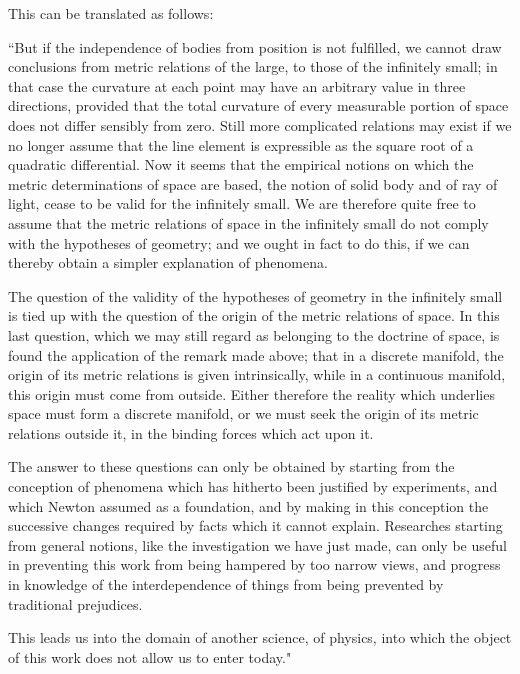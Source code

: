 \documentclass[12pt]{article}
\begin{document}
This can be translated as follows:

``But if the
independence of bodies from position is not fulfilled, we cannot
draw conclusions from metric relations of the large, to those of
the infinitely small; in that case the curvature at each point
may have an arbitrary value in three directions, provided that
the total curvature of every measurable portion of space does not
differ sensibly from zero.  Still more complicated relations may
exist if we no longer assume that the line element is expressible as
the square root of a quadratic differential. {\color{red}  Now it seems that the
empirical notions on which the metric determinations of space
are based, the notion of  solid body and of  ray of light,
cease to be valid for the infinitely small.  We are therefore
quite free to assume that the metric relations of space in
the infinitely small do not comply with the hypotheses of
geometry; and we ought in fact to do this, if we can thereby
obtain a simpler explanation of phenomena.}

The question of the validity of the hypotheses of geometry in the
infinitely small is tied up with the question of the origin of
the metric relations of space.  In this last question, which we
may still regard as belonging to the doctrine of space, is found
the application of the remark made above; that in a discrete
manifold, the origin of its metric relations is given intrinsically, while in a continuous manifold, this origin
must come from outside.  {\color{red} Either therefore the reality which
underlies space must form a discrete manifold, or we must
seek the origin of its metric relations outside it, in the binding
forces which act upon it.}

The answer to these questions can only be obtained by starting from
the conception of phenomena which has hitherto been justified by
experiments, and which Newton assumed as a foundation, and by
making in this conception the successive changes required by
facts which it cannot explain.  Researches starting from general
notions, like the investigation we have just made, can only be
useful in preventing this work from being hampered by too narrow
views, and progress in knowledge of the interdependence of things
from being prevented by traditional prejudices.

This leads us into the domain of another science, of physics, into
which the object of this work does not allow us to enter today."
\end{document}
